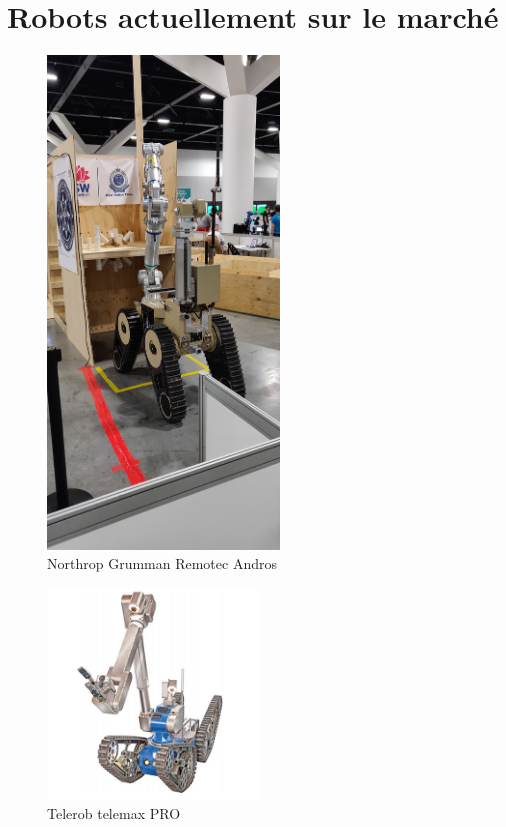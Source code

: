 \chapter{Robots actuellement sur le marché}\label{annexe:inspirationRobots}

\begin{figure}
    \centering
    \includegraphics[width=0.55\textwidth, angle=270, origin=c, trim={25cm 0 35cm 0},clip=true]{Figures/andros.jpg}
    \caption{Northrop Grumman Remotec Andros}
    \label{fig:andros}
\end{figure}

\begin{figure}
    \centering
    \includegraphics[width=0.5\textwidth]{Figures/telerob_telemax_PRO.jpg}
    \caption{Telerob telemax PRO}%
    \label{fig:telemaxPro}
\end{figure}